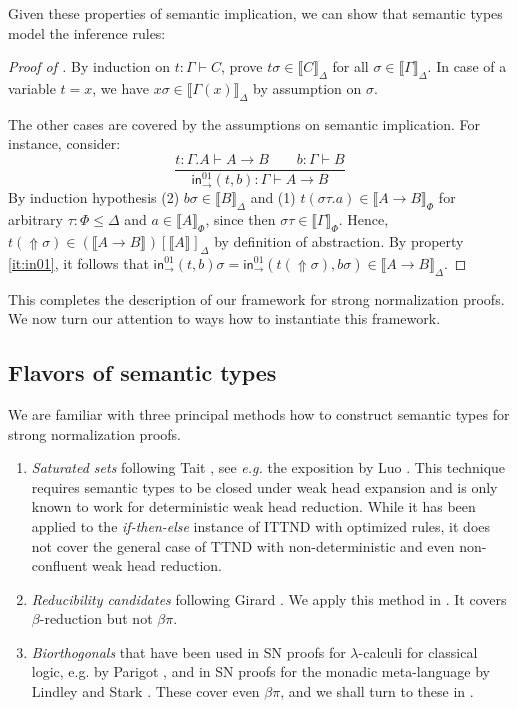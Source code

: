 \documentclass[a4paper,USenglish,cleveref, autoref, thm-restate]{lipics-v2019}
\newcommand{\eg}{\emph{e.g.}\xspace}
\newcommand{\den}[2][]{\llbracket#2\rrbracket^{#1}}
\newcommand{\ru}{\dfrac}
\newcommand{\Den}[2]{\den{#1}_{#2}}
\newcommand{\Gs}{\ensuremath{\sigma}}
\newcommand{\tin}{\ensuremath{\mathsf{in}}}
\newcommand{\inn}[2]{\ensuremath{\tin_{#1}^{#2}}}
\newcommand{\Up}{\mathop{\Uparrow}}
\begin{document}
Given these properties of semantic implication, we can show that
semantic types model the inference rules:

\begin{proof}[Proof of ]
  By induction on $t : \Gamma \vdash C$, prove $t\Gs \in \Den C \Delta$ for
  all $\Gs \in \Den \Gamma \Delta$.
  In case of a variable $t = x$, we have
  $x\Gs \in \Den{\Gamma(x)}\Delta$ by assumption on $\Gs$.

  The other cases are covered by the assumptions on semantic
  implication.  For instance, consider:
  \[
  \ru{t : \Gamma.A \vdash A \to B \qquad
      b : \Gamma \vdash B
    }{\inn\to{01}(t,b) : \Gamma \vdash A \to B
    }
  \]
  By induction hypothesis (2) $b\sigma \in \Den B \Delta$ and
  (1) $t(\sigma\tau.a) \in \Den{A \to B}\Phi$
  for arbitrary $\tau : \Phi \leq \Delta$ and $a \in \Den A \Phi$,
  since then $\sigma\tau \in \Den\Gamma\Phi$.
  Hence,
  $t(\Up\sigma) \in (\den{A \to B})[\den A]_\Delta$
  by definition of abstraction.
  By property \ref{it:in01}, it follows that
  $\inn\to{01}(t,b)\sigma = \inn\to{01}(t(\Up\sigma),b\sigma) \in \Den{A \to B}\Delta$.
\end{proof}

This completes the description of our framework for strong normalization proofs.
We now turn our attention to ways how to instantiate this framework.

\subsection{Flavors of semantic types}
\label{sec:flavors}

We are familiar with three principal methods how to construct semantic types for
strong normalization proofs.
\begin{enumerate}

\item \emph{Saturated sets} following Tait
  \cite{tait:functionalsFiniteTypeI}, see \eg the exposition by Luo
  \cite{luo:thesis}.
  This technique requires semantic types to be closed under weak head
  expansion and is only known to work for deterministic weak head
  reduction.
  While it has been applied \cite{geuversHurkens:icla17} to the
  \emph{if-then-else} instance of ITTND with optimized rules,
  it does not cover the general case of TTND with
  non-deterministic and even non-confluent weak head reduction.

\item \emph{Reducibility candidates} following Girard
  \cite{girard:thesis,girardLafontTaylor:proofsAndTypes}.  We apply
  this method in .
  It covers $\beta$-reduction but not $\beta\pi$.

\item \emph{Biorthogonals} that have been used in SN proofs for
  $\lambda$-calculi for classical logic, e.g. by Parigot \cite{parigot:jsl97},
  and in SN proofs for the monadic meta-language by Lindley and Stark
  \cite{lindleyStark:tlca05}.
  These cover even $\beta\pi$, and we shall turn to these in .
\end{enumerate}
\end{document}
